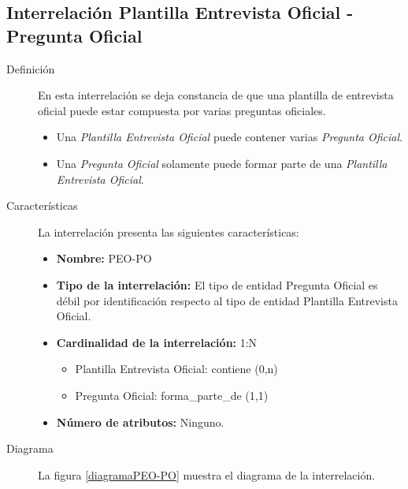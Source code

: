 \subsection{Interrelación Plantilla Entrevista Oficial - Pregunta Oficial}

   \begin{description}
      \item[Definición] En esta interrelación se deja constancia de que una
      plantilla de entrevista oficial puede estar compuesta por varias preguntas
      oficiales.

      \begin{itemize}
       \item Una \textit{Plantilla Entrevista Oficial} puede contener varias
             \textit{Pregunta Oficial}.
       \item Una \textit{Pregunta Oficial} solamente puede formar parte de una
             \textit{Plantilla Entrevista Oficial}.
      \end{itemize}

      \item[Características] La interrelación presenta las siguientes
                             características:

         \begin{itemize}
            \item \textbf{Nombre:} PEO-PO
            \item \textbf{Tipo de la interrelación:} El tipo de entidad Pregunta
                  Oficial es débil por identificación respecto al tipo de
                  entidad Plantilla Entrevista Oficial.
            \item \textbf{Cardinalidad de la interrelación:} 1:N
                  \begin{itemize}
                     \item Plantilla Entrevista Oficial: contiene (0,n)
                     \item Pregunta Oficial: forma\_parte\_de (1,1)
                  \end{itemize}
            \item \textbf{Número de atributos:} Ninguno.
         \end{itemize}

      \item[Diagrama] La figura \ref{diagramaPEO-PO} muestra el diagrama de la
                      interrelación.


\end{description}
